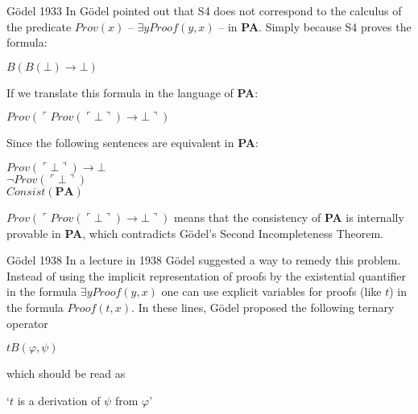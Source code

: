 \documentclass{beamer}
\theoremstyle{definition}
\newcommand{\nao}{\neg}
\newcommand{\impli}{\rightarrow}
\newcommand{\ex}{\exists}
\begin{document}
\begin{frame} {Gödel 1933}
 \qquad In \cite{Goedel33} Gödel pointed out that S4 does not correspond to the calculus of the predicate $Prov(x)$ -- $\ex y Proof (y,x)$ -- in \textbf{PA}. Simply because S4 proves the formula: 
 
 \begin{center}
 $B(B(\bot) \impli \bot)$
 \end{center}
 
 
\qquad If we translate this formula in the language of \textbf{PA}:
 
 
 
  \begin{center}
$Prov(\ulcorner Prov(\ulcorner\bot\urcorner) \impli \bot\urcorner)$
  \end{center}
 
\qquad Since the following sentences are equivalent in \textbf{PA}:

\begin{center}
	$Prov(\ulcorner\bot\urcorner) \impli \bot$\\
	$\nao Prov(\ulcorner\bot\urcorner)$\\
	$Consist(\textbf{PA})$
\end{center}

\qquad $Prov(\ulcorner Prov(\ulcorner\bot\urcorner) \impli \bot\urcorner)$ means that the consistency of \textbf{PA} is internally provable in \textbf{PA}, which contradicts Gödel's Second Incompleteness Theorem.
\end{frame}


\begin{frame} {Gödel 1938}
\qquad In a lecture in 1938 \cite{Goedel38} Gödel suggested a way to remedy this problem. Instead of using the implicit representation of proofs by the existential quantifier in the formula $\ex y Proof (y,x)$ one can use explicit variables for proofs (like $t$) in the formula $Proof (t,x)$. In these lines, Gödel proposed the following ternary operator

\begin{center}
$tB(\varphi,\psi)$
\end{center}


\qquad which should be read as
\begin{center}
`$t$ is a derivation of $\psi$ from $\varphi$'
\end{center}
\end{frame}
\end{document}
